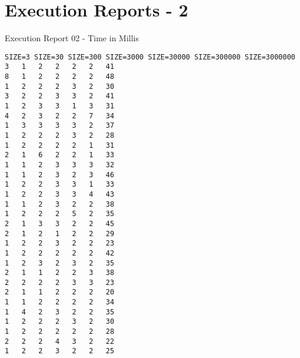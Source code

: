 
\chapter{Execution Reports - 2}
\label{executionreport02}

Execution Report 02 - Time in Millis
\begin{lstlisting}
SIZE=3 SIZE=30 SIZE=300 SIZE=3000 SIZE=30000 SIZE=300000 SIZE=3000000
3	1	2	2	2	2	41
8	1	2	2	2	2	48
1	2	2	2	3	2	30
3	2	2	3	3	2	41
1	2	3	3	1	3	31
4	2	3	2	2	7	34
1	3	3	3	3	2	37
1	2	2	2	3	2	28
1	2	2	2	2	1	31
2	1	6	2	2	1	33
1	1	2	3	3	3	32
1	1	2	3	2	3	46
1	2	2	3	3	1	33
1	2	2	3	3	4	43
1	1	2	3	2	2	38
1	2	2	2	5	2	35
2	1	3	3	2	2	45
2	1	2	1	2	2	29
1	2	2	3	2	2	23
1	2	2	2	2	2	42
1	2	3	2	3	2	35
2	1	1	2	2	3	38
2	2	2	2	3	3	23
2	1	1	2	2	2	20
1	1	2	2	2	2	34
1	4	2	3	2	2	35
1	2	2	2	3	2	30
1	2	2	2	2	2	28
2	2	2	4	3	2	22
1	2	2	3	2	2	25
\end{lstlisting}